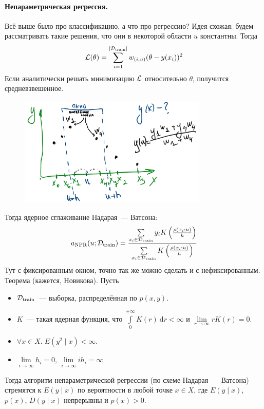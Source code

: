 \documentclass{article}
\begin{document}
    \paragraph{Непараметрическая регрессия.}
    Всё выше было про классификацию, а что про регрессию? Идея схожая: будем рассматривать такие решения, что они в некоторой области $u$ константны. Тогда
    \[
    {\mathcal{L}}(\theta)=\sum\limits_{i=1}^{|{\mathcal{D}}_{\mathrm{train}}|}w_{(i,u)}(\theta-y(x_i))^2
    \]
    Если аналитически решать минимизацию ${\mathcal{L}}$ относительно $\theta$, получится средневзвешенное.
    \begin{figure}[H]
        \includegraphics[width=0.8\textwidth]{Images/ml_knn-2}
    \end{figure}\noindent
    Тогда ядерное сглаживание Надарая~--- Ватсона:
    \[
    a_{\mathrm{NPR}}(u;{\mathcal{D}}_{\mathrm{train}})=\dfrac{\sum\limits_{x_i\in{\mathcal{D}}_{\mathrm{train}}}y_iK\left(\frac{\rho(x_i;u)}h\right)}{\sum\limits_{x_i\in{\mathcal{D}}_{\mathrm{train}}}K\left(\frac{\rho(x_i;u)}h\right)}
    \]
    Тут с фиксированным окном, точно так же можно сделать и с нефиксированным.\\
    Теорема (кажется, Новикова). Пусть
    \begin{itemize}
        \item ${\mathcal{D}}_{\mathrm{train}}$~--- выборка, распределённая по $p(x,y)$.
        \item $K$~--- такая ядерная функция, что $\int\limits_0^{+\infty}K(r)~\mathrm dr<\infty$ и $\lim\limits_{r\to\infty}rK(r)=0$.
        \item $\forall x\in X.\;E(y^2\mid x)<\infty$.
        \item $\lim\limits_{i\to\infty}h_i=0$, $\lim\limits_{i\to\infty}ih_i=\infty$
    \end{itemize}
    Тогда алгоритм непараметрической регрессии (по схеме Надарая~--- Ватсона) стремятся к $E(y\mid x)$ по вероятности в любой точке $x\in X$, где $E(y\mid x)$, $p(x)$, $D(y\mid x)$ непрерывны и $p(x)>0$. 
\end{document}
